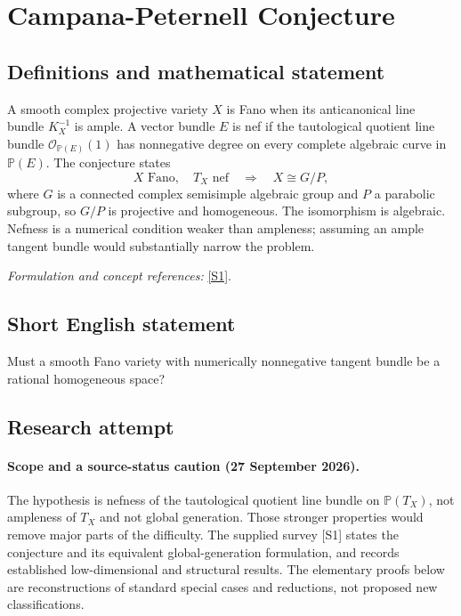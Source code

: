 \documentclass[11pt]{article}
\begin{document}
\section*{\texorpdfstring{Campana-Peternell Conjecture}{Campana-Peternell Conjecture}}\label{468}
\subsection{Definitions and mathematical statement}
A smooth complex projective variety $X$ is Fano when its anticanonical line bundle $K_X^{-1}$ is ample. A vector bundle $E$ is nef if the tautological quotient line bundle $\mathcal O_{{\mathbb{P}}(E)}(1)$ has nonnegative degree on every complete algebraic curve in ${\mathbb{P}}(E)$. The conjecture states
\[
 X\text{ Fano},\quad T_X\text{ nef}
 \quad\Longrightarrow\quad X\cong G/P,
\]
where $G$ is a connected complex semisimple algebraic group and $P$ a parabolic subgroup, so $G/P$ is projective and homogeneous. The isomorphism is algebraic. Nefness is a numerical condition weaker than ampleness; assuming an ample tangent bundle would substantially narrow the problem.
\par\smallskip\textit{Formulation and concept references:} \href{https://arxiv.org/abs/1407.6483}{[S1]}.

\subsection{Short English statement}
Must a smooth Fano variety with numerically nonnegative tangent bundle be a rational homogeneous space?
\subsection{Research attempt}

\paragraph{Scope and a source-status caution (27 September 2026).}
The hypothesis is nefness of the tautological quotient line bundle on
$\mathbb P(T_X)$, not ampleness of $T_X$ and not global generation.
Those stronger properties would remove major parts of the difficulty.
The supplied survey [S1] states the conjecture and its equivalent
global-generation formulation, and records established low-dimensional
and structural results. The elementary proofs below are reconstructions
of standard special cases and reductions, not proposed new classifications.
\end{document}
